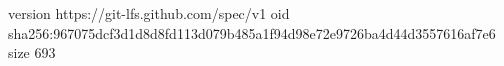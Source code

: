 version https://git-lfs.github.com/spec/v1
oid sha256:967075dcf3d1d8d8fd113d079b485a1f94d98e72e9726ba4d44d3557616af7e6
size 693
